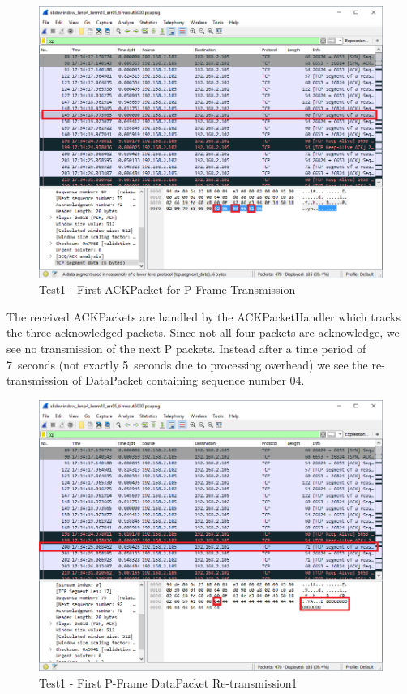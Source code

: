 \documentclass[12pt]{article}
\begin{document}
\begin{figure}[H]
    \centering
    \includegraphics[width=5.5in]{slide_test1_01.png}
    \caption{Test1 - First ACKPacket for P-Frame Transmission}
    \label{fig:slidetest01}
\end{figure}

The received ACKPackets are handled by the ACKPacketHandler which tracks
the three acknowledged packets. Since not all four packets are acknowledge,
we see no transmission of the next P packets. Instead after a time period of
7~seconds (not exactly 5~seconds due to processing overhead) we see the 
re-transmission of DataPacket containing sequence number 04.

\begin{figure}[H]
    \centering
    \includegraphics[width=5.5in]{slide_test1_02.png}
    \caption{Test1 - First P-Frame DataPacket Re-transmission1}
    \label{fig:slidetest02}
\end{figure}
\end{document}
